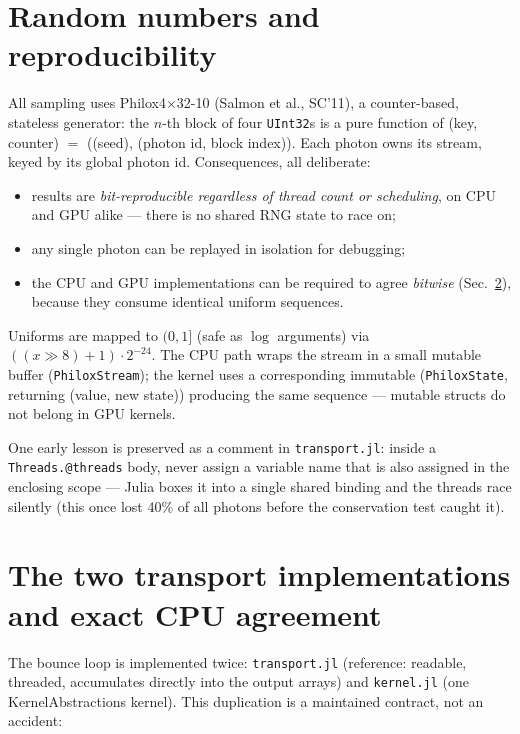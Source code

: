 \documentclass[11pt,a4paper]{article}
\newcommand{\code}[1]{\texttt{#1}}
\begin{document}
\section{Random numbers and reproducibility}
\label{sec:rng}

All sampling uses Philox4$\times$32-10 (Salmon et al., SC'11), a counter-based,
stateless generator: the $n$-th block of four \code{UInt32}s is a pure function of
(key, counter) $=$ ((seed), (photon id, block index)). Each photon owns its stream,
keyed by its global photon id. Consequences, all deliberate:

\begin{itemize}
  \item results are \emph{bit-reproducible regardless of thread count or scheduling},
    on CPU and GPU alike --- there is no shared RNG state to race on;
  \item any single photon can be replayed in isolation for debugging;
  \item the CPU and GPU implementations can be required to agree \emph{bitwise}
    (Sec.~\ref{sec:twins}), because they consume identical uniform sequences.
\end{itemize}

Uniforms are mapped to $(0,1]$ (safe as $\log$ arguments) via
$((x \gg 8) + 1) \cdot 2^{-24}$. The CPU path wraps the stream in a small mutable
buffer (\code{PhiloxStream}); the kernel uses a corresponding immutable
(\code{PhiloxState}, returning (value, new state)) producing the same sequence ---
mutable structs do not belong in GPU kernels.

One early lesson is preserved as a comment in \code{transport.jl}: inside a
\code{Threads.@threads} body, never assign a variable name that is also assigned in
the enclosing scope --- Julia boxes it into a single shared binding and the threads
race silently (this once lost 40\% of all photons before the conservation test caught
it).

\section{The two transport implementations and exact CPU agreement}
\label{sec:twins}

The bounce loop is implemented twice: \code{transport.jl} (reference: readable,
threaded, accumulates directly into the output arrays) and \code{kernel.jl} (one
KernelAbstractions kernel). This duplication is a maintained contract, not an
accident:
\end{document}
